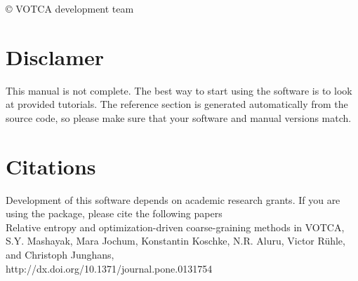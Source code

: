 \begin{titlepage}


\vspace*{3cm}
\vspace*{1cm}
\vfill
\vspace*{1.4cm}
\center{\large{\today}}
\vspace*{-0.3cm}

\vspace*{1cm}
\large{\copyright \hspace*{0.1cm} VOTCA development team}
\vspace*{0.5cm}

\end{titlepage}

\section*{Disclamer}
This manual is not complete. The best way to start using the software is to look at provided tutorials. The reference section is generated automatically from the source code, so please make sure that your software and manual versions match.  

\section*{Citations}
Development of this software depends on academic research grants. If you are using the package, please cite the  following papers \\

\vspace{0.1cm}
\noindent
\cite{mashayakrelative} Relative entropy and optimization-driven coarse-graining methods in VOTCA, \\
S.Y. Mashayak, Mara Jochum, Konstantin Koschke, N.R. Aluru, Victor R\"uhle, and Christoph Junghans,\\
{http://dx.doi.org/10.1371/journal.pone.0131754}

